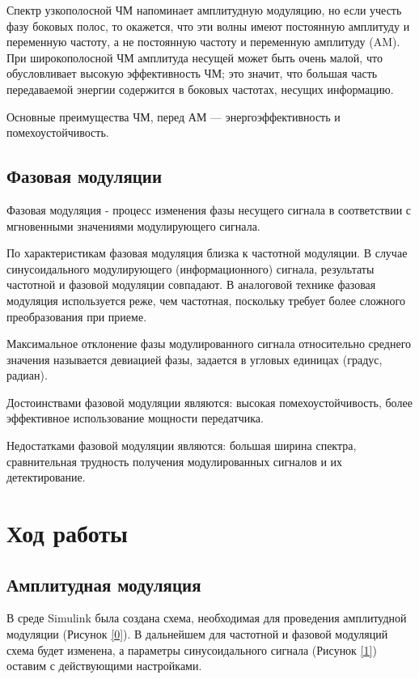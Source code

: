 \documentclass[a4paper,14pt]{extarticle}
\begin{document}
Спектр узкополосной ЧМ напоминает амплитудную модуляцию, но если учесть фазу боковых полос, то окажется, что эти волны имеют постоянную амплитуду и переменную частоту, а не постоянную частоту и переменную амплитуду (AM). При широкополосной ЧМ амплитуда несущей может быть очень малой, что обусловливает высокую эффективность ЧМ; это значит, что большая часть передаваемой энергии содержится в боковых частотах, несущих информацию.

Основные преимущества ЧМ, перед АМ — энергоэффективность и помехоустойчивость.

\subsection{Фазовая модуляции}

Фазовая модуляция - процесс изменения фазы несущего сигнала в соответствии с мгновенными значениями модулирующего сигнала.

По характеристикам фазовая модуляция близка к частотной модуляции. В случае синусоидального модулирующего (информационного) сигнала, результаты частотной и фазовой модуляции совпадают. В аналоговой технике фазовая модуляция используется реже, чем частотная, поскольку требует более сложного преобразования при приеме.

Максимальное отклонение фазы модулированного сигнала относительно среднего значения называется девиацией фазы, задается в угловых единицах (градус, радиан).

Достоинствами фазовой модуляции являются: высокая помехоустойчивость, более эффективное использование мощности передатчика.

Недостатками фазовой модуляции являются: большая ширина спектра, сравнительная трудность получения модулированных сигналов и их детектирование.

\newpage


\section{Ход работы}

\subsection{Амплитудная модуляция}

В среде Simulink была создана схема, необходимая для проведения амплитудной модуляции (Рисунок \ref{0}). В дальнейшем для частотной и фазовой модуляций схема будет изменена, а параметры синусоидального сигнала (Рисунок \ref{1}) оставим с действующими настройками. 
\end{document}
